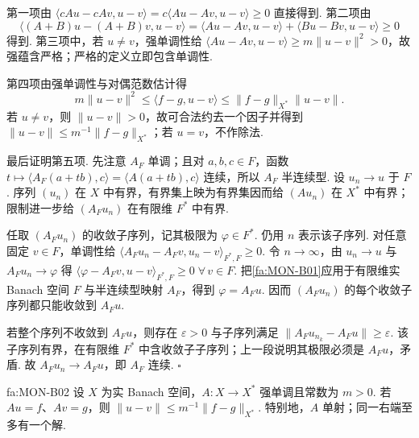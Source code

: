 \begin{FAProof}
第一项由
\(\displaystyle \langle cAu-cAv,u-v\rangle = c\langle Au-Av,u-v\rangle \geqslant0\)
直接得到. 第二项由
\[
\langle(A+B)u-(A+B)v,u-v\rangle
=
\langle Au-Av,u-v\rangle
+
\langle Bu-Bv,u-v\rangle
\geqslant0
\]
得到. 第三项中，若 \(\displaystyle u\neq v\)，强单调性给 \(\displaystyle\langle Au-Av,u-v\rangle\geqslant m\|u-v\|^2>0\)，故强蕴含严格；严格的定义立即包含单调性.

第四项由强单调性与对偶范数估计得
\[
m\|u-v\|^2
\leqslant
\langle f-g,u-v\rangle
\leqslant
\|f-g\|_{X^*}\|u-v\|.
\]
若 \(\displaystyle u\neq v\)，则 \(\displaystyle\|u-v\|>0\)，故可合法约去一个因子并得到 \(\displaystyle\|u-v\|\leqslant m^{-1}\|f-g\|_{X^*}\)；若 \(\displaystyle u=v\)，不作除法.

最后证明第五项. 先注意 \(\displaystyle A_F\) 单调；且对 \(\displaystyle a,b,c\in F\)，函数 \(\displaystyle t\mapsto\langle A_F(a+tb),c\rangle=\langle A(a+tb),c\rangle\) 连续，所以 \(\displaystyle A_F\) 半连续型. 设 \(\displaystyle u_n\to u\) 于 \(\displaystyle F\). 序列 \(\displaystyle(u_n)\) 在 \(\displaystyle X\) 中有界，有界集上映为有界集因而给 \(\displaystyle(Au_n)\) 在 \(\displaystyle X^*\) 中有界；限制进一步给 \(\displaystyle(A_Fu_n)\) 在有限维 \(\displaystyle F^*\) 中有界.

任取 \(\displaystyle(A_Fu_n)\) 的收敛子序列，记其极限为 \(\displaystyle\varphi\in F^*\). 仍用 \(\displaystyle n\) 表示该子序列. 对任意固定 \(\displaystyle v\in F\)，单调性给
\(\displaystyle \langle A_Fu_n-A_Fv,u_n-v\rangle_{F^*,F}\geqslant0.\)
令 \(\displaystyle n\to\infty\)，由 \(\displaystyle u_n\to u\) 与 \(\displaystyle A_Fu_n\to\varphi\) 得
\(\displaystyle \langle\varphi-A_Fv,u-v\rangle_{F^*,F}\geqslant0 \;\forall\,v\in F.\)
把\autoref{fa:MON-B01}应用于有限维实 Banach 空间 \(\displaystyle F\) 与半连续型映射 \(\displaystyle A_F\)，得到 \(\displaystyle\varphi=A_Fu\). 因而 \(\displaystyle(A_Fu_n)\) 的每个收敛子序列都只能收敛到 \(\displaystyle A_Fu\).

若整个序列不收敛到 \(\displaystyle A_Fu\)，则存在 \(\displaystyle\varepsilon>0\) 与子序列满足 \(\displaystyle\|A_Fu_{n_k}-A_Fu\|\geqslant\varepsilon\). 该子序列有界，在有限维 \(\displaystyle F^*\) 中含收敛子子序列；上一段说明其极限必须是 \(\displaystyle A_Fu\)，矛盾. 故 \(\displaystyle A_Fu_n\to A_Fu\)，即 \(\displaystyle A_F\) 连续.
\hfill\(\square\)
\end{FAProof}

\begin{FATheorem}[B][强单调算子的唯一性与稳定性]{fa:MON-B02}
设 \(\displaystyle X\) 为实 Banach 空间，\(\displaystyle A:X\to X^*\) 强单调且常数为 \(\displaystyle m>0\). 若 \(\displaystyle Au=f\)、\(\displaystyle Av=g\)，则
\(\displaystyle \|u-v\| \leqslant m^{-1}\|f-g\|_{X^*}.\)
特别地，\(\displaystyle A\) 单射；同一右端至多有一个解.
\end{FATheorem}

